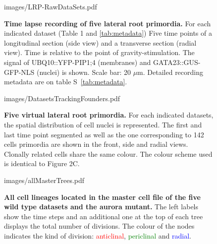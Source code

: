 \documentclass[11pt,a4paper, draft]{article}
\begin{document}
%
\clearpage
%
\begin{figure}[htbp]
	\begin{center}
	\begin{overpic}[width=1.\linewidth]{images/LRP-RawDataSets.pdf}
	\end{overpic}
\caption[Time lapse recording of five lateral root primordia.]
{{\bf Time lapse recording of five lateral root primordia.} For each indicated dataset (Table 1 and \ref{tab:metadata}) Five time points of a longitudinal section (side view) and a transverse section (radial view). Time is relative to the point of gravity-stimulation. The signal of UBQ10::YFP-PIP1;4 (membranes) and GATA23::GUS-GFP-NLS (nuclei) is shown. Scale bar: 20 $\mu$m. Detailed recording metadata are on table S~\ref{tab:metadata}.}
	\label{fig:alldatasets}
	\end{center}
\end{figure}
%
\clearpage
\begin{figure}[htbp]
	\begin{center}
	\begin{overpic}[width=1.\linewidth]{images/DatasetsTrackingFounders.pdf}
	\end{overpic}
\caption[Five virtual lateral root primordia.]
{{\bf Five virtual lateral root primordia.} For each indicated datasets, the spatial distribution of cell nuclei is represented. The first and last time point segmented as well as the one corresponding to 142 cells primordia are shown in the front, side and radial views. Clonally related cells share the same colour. The colour scheme used is identical to Figure 2C. }
	\label{fig:trackingfounders}
	\end{center}
\end{figure}
%
\clearpage
%
\begin{figure}[htbp]
	\begin{center}
		\begin{overpic}[width=0.95\linewidth]{images/allMasterTrees.pdf}
		\end{overpic}
\caption[All cell lineages located in the master cell file of the five wild type datasets and the aurora mutant.]
{
{\bf All cell lineages located in the master cell file of the five wild type datasets and the aurora mutant.} The left labels show the time steps and an additional one at the top of each tree displays the total number of divisions. The colour of the nodes indicates the kind of division: \textcolor{red}{anticlinal}, \textcolor{green}{periclinal} and \textcolor{blue}{radial}.
}
	\label{fig:allMasterTrees}
	\end{center}
\end{figure}
\end{document}
